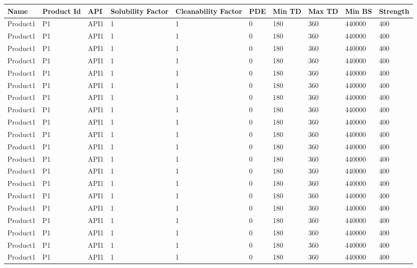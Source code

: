 \documentclass{article}
\begin{document}
        \begin{longtable}[l]{|p{1.5cm}|p{1.7cm}|p{1cm}|p{1.5cm}|p{1.7cm}|p{1cm}|p{1cm}|p{1cm}|p{1cm}|p{1.5cm}|}

\hline
Name & Product Id & API & Solubility Factor & Cleanability Factor & PDE & Min TD & Max TD & Min BS & Strength\\
\hline

Product1 & P1 & API1 & 1 & 1 & 0 & 180 & 360 & 440000 & 400\\
\hline
Product1 & P1 & API1 & 1 & 1 & 0 & 180 & 360 & 440000 & 400\\
\hline
Product1 & P1 & API1 & 1 & 1 & 0 & 180 & 360 & 440000 & 400\\
\hline
Product1 & P1 & API1 & 1 & 1 & 0 & 180 & 360 & 440000 & 400\\
\hline
Product1 & P1 & API1 & 1 & 1 & 0 & 180 & 360 & 440000 & 400\\
\hline
Product1 & P1 & API1 & 1 & 1 & 0 & 180 & 360 & 440000 & 400\\
\hline
Product1 & P1 & API1 & 1 & 1 & 0 & 180 & 360 & 440000 & 400\\
\hline
Product1 & P1 & API1 & 1 & 1 & 0 & 180 & 360 & 440000 & 400\\
\hline
Product1 & P1 & API1 & 1 & 1 & 0 & 180 & 360 & 440000 & 400\\
\hline
Product1 & P1 & API1 & 1 & 1 & 0 & 180 & 360 & 440000 & 400\\
\hline
Product1 & P1 & API1 & 1 & 1 & 0 & 180 & 360 & 440000 & 400\\
\hline
Product1 & P1 & API1 & 1 & 1 & 0 & 180 & 360 & 440000 & 400\\
\hline
Product1 & P1 & API1 & 1 & 1 & 0 & 180 & 360 & 440000 & 400\\
\hline
Product1 & P1 & API1 & 1 & 1 & 0 & 180 & 360 & 440000 & 400\\
\hline
Product1 & P1 & API1 & 1 & 1 & 0 & 180 & 360 & 440000 & 400\\
\hline
Product1 & P1 & API1 & 1 & 1 & 0 & 180 & 360 & 440000 & 400\\
\hline
Product1 & P1 & API1 & 1 & 1 & 0 & 180 & 360 & 440000 & 400\\
\hline
Product1 & P1 & API1 & 1 & 1 & 0 & 180 & 360 & 440000 & 400\\
\hline
Product1 & P1 & API1 & 1 & 1 & 0 & 180 & 360 & 440000 & 400\\
\hline
Product1 & P1 & API1 & 1 & 1 & 0 & 180 & 360 & 440000 & 400\\

\end{longtable}
\end{document}
